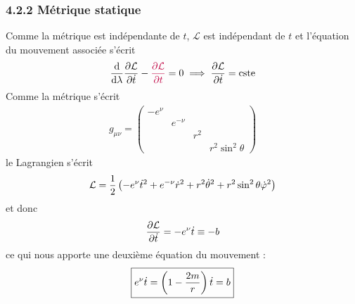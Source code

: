 \subsubsection{4.2.2 Métrique statique}
Comme la métrique est indépendante de $t$, $\mathcal{L}$ est indépendant de $t$ et l'équation du mouvement associée s'écrit
\begin{equation}
    \frac{\mathrm{d}}{\mathrm{d} \lambda} \frac{\partial \mathcal{L}}{\partial \dot{t}} - \textcolor{purple}{\frac{\partial \mathcal{L}}{\partial t}} = 0 \implies \frac{\partial \mathcal{L}}{\partial \dot{t}} = \text{cste}
\end{equation}
Comme la métrique s'écrit
\begin{align}
    g_{\mu\nu} = \begin{pmatrix}
        - e^\nu & & & \\
        & e^{-\nu} & & \\
        & & r^2 & \\
        & & & r^2 \sin^2 \theta
    \end{pmatrix}
\end{align}
le Lagrangien s'écrit
\begin{equation}
    \mathcal{L} = \frac{1}{2} \left( - e^\nu \dot{t}^2 + e^{-\nu} \dot{r}^2 + r^2 \dot{\theta}^2 +r^2 \sin^2 \theta \dot{\varphi}^2\right)
\end{equation}
et donc 
\begin{equation}
    \frac{\partial \mathcal{L}}{\partial \dot{t}} = - e^\nu \dot{t} \equiv - b
\end{equation}
ce qui nous apporte une deuxième équation du mouvement :
\begin{equation}
    \boxed{e^\nu \dot{t} = \left( 1 - \frac{2m}{r} \right) \dot{t} = b}
\end{equation}
